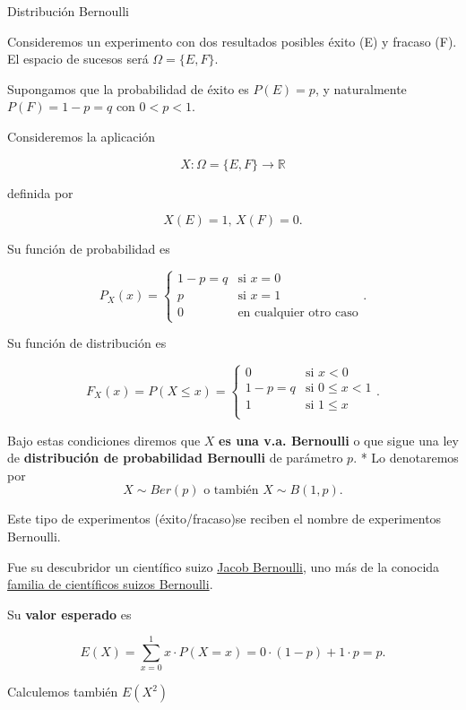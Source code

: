 \documentclass[
  letterpaper,
  DIV=11,
  numbers=noendperiod]{scrreprt}
\begin{document}
\begin{Definicion}{Distribución Bernoulli}{}

Consideremos un experimento con dos resultados posibles éxito (E) y
fracaso (F). El espacio de sucesos será \(\Omega=\{E,F\}\).

Supongamos que la probabilidad de éxito es \(P(E)=p\), y naturalmente
\(P(F)=1-p=q\) con \(0<p<1\).

Consideremos la aplicación

\[
X:\Omega=\{E,F\}\to \mathbb{R}
\]

definida por

\[
X(E)=1\mbox{, }X(F)=0.
\]

Su función de probabilidad es

\[
P_{X}(x)=
\left\{
\begin{array}{ll} 1-p=q & \mbox{si } x=0\\
p & \mbox{si } x=1\\
0 & \mbox{en cualquier otro caso}
\end{array}
\right..
\]

Su función de distribución es

\[
F_{X}(x)=P(X\leq x)=
\left\{
\begin{array}{ll} 
0 & \mbox{si } x<0\\
1-p=q & \mbox{si } 0\leq x <1\\
1 & \mbox{si } 1\leq x \\
\end{array}
\right..
\]

Bajo estas condiciones diremos que \(X\) \textbf{es una v.a. Bernoulli}
o que sigue una ley de \textbf{distribución de probabilidad Bernoulli}
de parámetro \(p\). * Lo denotaremos por
\[X\sim Ber(p)\mbox{ o también } X\sim B(1,p).\]

\end{Definicion}

Este tipo de experimentos (éxito/fracaso)se reciben el nombre de
experimentos Bernoulli.

Fue su descubridor un científico suizo
\href{https://es.wikipedia.org/wiki/Jakob_Bernoulli}{Jacob Bernoulli},
uno más de la conocida
\href{https://es.wikipedia.org/wiki/Familia_Bernoulli}{familia de
científicos suizos Bernoulli}.

Su \textbf{valor esperado} es

\[E(X)=\displaystyle\sum_{x=0}^1 x\cdot P(X=x)= 0\cdot(1-p)+1\cdot p=p.\]

Calculemos también \(E(X^2)\)
\end{document}

